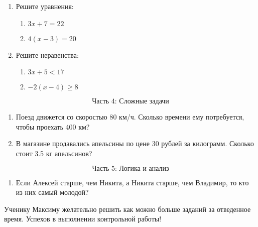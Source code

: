 \documentclass{article}
\begin{document}
\begin{enumerate}
    \item Решите уравнения:
    \begin{enumerate}
        \item \(3x + 7 = 22\)
        \item \(4(x - 3) = 20\)
    \end{enumerate}
    
    \item Решите неравенства:
    \begin{enumerate}
        \item \(3x + 5 < 17\)
        \item \(-2(x - 4) \geq 8\)
    \end{enumerate}
\end{enumerate}

\[
\text{Часть 4: Сложные задачи}
\]

\begin{enumerate}
    \item Поезд движется со скоростью 80 км/ч. Сколько времени ему потребуется, чтобы проехать 400 км?
    \item В магазине продавались апельсины по цене 30 рублей за килограмм. Сколько стоит 3.5 кг апельсинов?
\end{enumerate}

\[
\text{Часть 5: Логика и анализ}
\]

\begin{enumerate}
    \item Если Алексей старше, чем Никита, а Никита старше, чем Владимир, то кто из них самый молодой?
\end{enumerate}

Ученику Максиму желательно решить как можно больше заданий за отведенное время. Успехов в выполнении контрольной работы!
\end{document}
